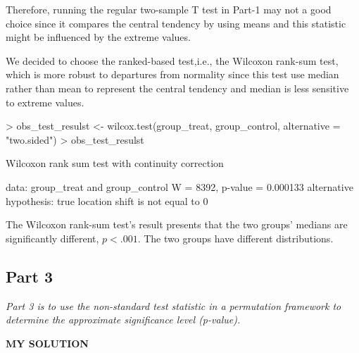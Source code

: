 \documentclass[
]{article}
\newenvironment{Shaded}{\begin{snugshade}}{\end{snugshade}}
\newcommand{\AttributeTok}[1]{\textcolor[rgb]{0.77,0.63,0.00}{#1}}
\newcommand{\DecValTok}[1]{\textcolor[rgb]{0.00,0.00,0.81}{#1}}
\newcommand{\FloatTok}[1]{\textcolor[rgb]{0.00,0.00,0.81}{#1}}
\newcommand{\FunctionTok}[1]{\textcolor[rgb]{0.00,0.00,0.00}{#1}}
\newcommand{\NormalTok}[1]{#1}
\newcommand{\OtherTok}[1]{\textcolor[rgb]{0.56,0.35,0.01}{#1}}
\newcommand{\SpecialCharTok}[1]{\textcolor[rgb]{0.00,0.00,0.00}{#1}}
\newcommand{\StringTok}[1]{\textcolor[rgb]{0.31,0.60,0.02}{#1}}
\begin{document}
Therefore, running the regular two-sample T test in Part-1 may not a
good choice since it compares the central tendency by using means and
this statistic might be influenced by the extreme values.

We decided to choose the ranked-based test,i.e., the Wilcoxon rank-sum
test, which is more robust to departures from normality since this test
use median rather than mean to represent the central tendency and median
is less sensitive to extreme values.

\begin{Shaded}
\begin{Highlighting}[]
\SpecialCharTok{\textgreater{}}\NormalTok{ obs\_test\_resulst }\OtherTok{\textless{}{-}} \FunctionTok{wilcox.test}\NormalTok{(group\_treat, group\_control, }\AttributeTok{alternative =} \StringTok{"two.sided"}\NormalTok{)}
\SpecialCharTok{\textgreater{}}\NormalTok{ obs\_test\_resulst}

\NormalTok{    Wilcoxon rank sum test with continuity correction}

\NormalTok{data}\SpecialCharTok{:}\NormalTok{  group\_treat and group\_control}
\NormalTok{W }\OtherTok{=} \DecValTok{8392}\NormalTok{, p}\SpecialCharTok{{-}}\NormalTok{value }\OtherTok{=} \FloatTok{0.000133}
\NormalTok{alternative hypothesis}\SpecialCharTok{:}\NormalTok{ true location shift is not equal to }\DecValTok{0}
\end{Highlighting}
\end{Shaded}

The Wilcoxon rank-sum test's result presents that the two groups'
medians are significantly different, \(p < .001\). The two groups have
different distributions.

\hypertarget{part-3}{%
\subsection{Part 3}\label{part-3}}

\emph{Part 3 is to use the non-standard test statistic in a permutation
framework to determine the approximate significance level (p-value).}

\textbf{MY SOLUTION}
\end{document}
